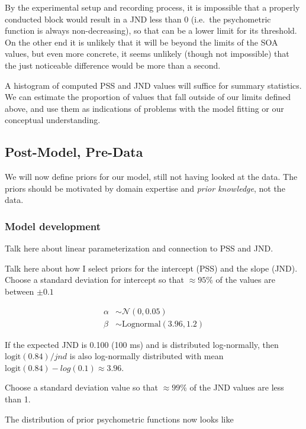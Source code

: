 \documentclass[11pt, oneside, openany]{scrbook}
\begin{document}
By the experimental setup and recording process, it is impossible that a properly conducted block would result in a JND less than 0 (i.e.~the psychometric function is always non-decreasing), so that can be a lower limit for its threshold. On the other end it is unlikely that it will be beyond the limits of the SOA values, but even more concrete, it seems unlikely (though not impossible) that the just noticeable difference would be more than a second.

A histogram of computed PSS and JND values will suffice for summary statistics. We can estimate the proportion of values that fall outside of our limits defined above, and use them as indications of problems with the model fitting or our conceptual understanding.

\hypertarget{post-model-pre-data}{%
\subsection{Post-Model, Pre-Data}\label{post-model-pre-data}}

We will now define priors for our model, still not having looked at the data. The priors should be motivated by domain expertise and \emph{prior knowledge}, not the data.

\hypertarget{model-development}{%
\subsubsection{Model development}\label{model-development}}

Talk here about linear parameterization and connection to PSS and JND.

Talk here about how I select priors for the intercept (PSS) and the slope (JND). Choose a standard deviation for intercept so that \(\approx 95\%\) of the values are between \(\pm 0.1\)

\begin{align*}
\alpha &\sim \mathcal{N}(0, 0.05) \\
\beta &\sim \mathrm{Lognormal}(3.96, 1.2)
\end{align*}

If the expected JND is 0.100 (100 ms) and is distributed log-normally, then \(\mathrm{logit}(0.84)/jnd\) is also log-normally distributed with mean \(\mathrm{logit}(0.84) - log(0.1) \approx 3.96\).

Choose a standard deviation value so that \(\approx 99\%\) of the JND values are less than 1.

The distribution of prior psychometric functions now looks like
\end{document}
